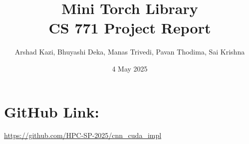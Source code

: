 \documentclass{article}
\title{Mini Torch Library\\CS 771 Project Report}
\author{Arshad Kazi, Bhuyashi Deka, Manas Trivedi, Pavan Thodima, Sai Krishna}
\date{4 May 2025}
\begin{document}
\maketitle

\section*{GitHub Link:} \url{https://github.com/HPC-SP-2025/cnn_cuda_impl}











\printbibliography



\end{document}
